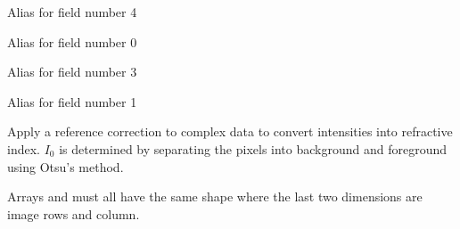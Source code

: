 \documentclass[letterpaper,10pt,english]{sphinxmanual}
\begin{document}
\begin{fulllineitems}
\begin{fulllineitems}
\label{\detokenize{xanespy:xanespy.xanes_math.KEdgeParams.pre_m}}
Alias for field number 4

\end{fulllineitems}


\begin{fulllineitems}
\label{\detokenize{xanespy:xanespy.xanes_math.KEdgeParams.scale}}
Alias for field number 0

\end{fulllineitems}


\begin{fulllineitems}
\label{\detokenize{xanespy:xanespy.xanes_math.KEdgeParams.sigw}}
Alias for field number 3

\end{fulllineitems}


\begin{fulllineitems}
\label{\detokenize{xanespy:xanespy.xanes_math.KEdgeParams.voffset}}
Alias for field number 1

\end{fulllineitems}


\end{fulllineitems}


\begin{fulllineitems}
\label{\detokenize{xanespy:xanespy.xanes_math.apply_internal_reference}}
Apply a reference correction to complex data to convert intensities
into refractive index. \(I_0\) is determined by separating the pixels
into background and foreground using Otsu's method.

Arrays  and  must all have the same shape where
the last two dimensions are image rows and column.

\end{fulllineitems}
\end{document}
